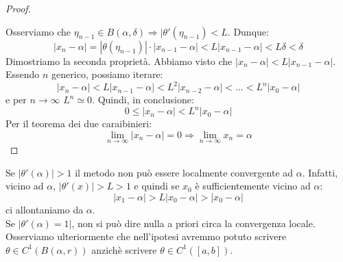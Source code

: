 \documentclass[12pt]{report}
\begin{document}
\begin{proof}
\begin{center}
	\end{center}
	Osserviamo che $\eta_{n-1} \in B(\alpha, \delta) \Rightarrow |\theta'(\eta_{n-1}) < L$. Dunque:
	\[
	|x_n - \alpha| = |\theta(\eta_{n-1})|\cdot |x_{n-1}-\alpha| < L|x_{n-1}-\alpha| < L\delta < \delta
	\]
	Dimostriamo la seconda proprietà. Abbiamo visto che $|x_n - \alpha| < L|x_{n-1} - \alpha|$. \\
	Essendo $n$ generico, possiamo iterare:
	\[
	|x_n - \alpha| < L|x_{n-1}-\alpha| < L^2|x_{n-2} - \alpha| < \dots < L^n|x_0 - \alpha|
	\]
	e per $n \to \infty$ $L^n \simeq 0$. Quindi, in conclusione:
	\[
	0 \leq |x_n - \alpha| < L^n|x_0 - \alpha|
	\]
	Per il teorema dei due caraibinieri:
	\[
	\lim\limits_{n\to\infty}|x_n - \alpha| = 0 \Rightarrow \lim\limits_{n\to\infty}x_n = \alpha
	\]
\end{proof}
\begin{note}{}{}
	Se $|\theta'(\alpha)| > 1$ il metodo non può essere localmente convergente ad $\alpha$. Infatti, vicino ad $\alpha$, $|\theta'(x)| > L > 1$ e quindi se $x_0$ è sufficientemente vicino ad $\alpha$:
	\[
	|x_1 - \alpha| > L|x_0 - \alpha| > |x_0 - \alpha|
	\]
	ci allontaniamo da $\alpha$. \\
	Se $|\theta'(\alpha) = 1|$, non si può dire nulla a priori circa la convergenza locale. \\
	Osserviamo ulteriormente che nell'ipotesi avremmo potuto scrivere $\theta \in C^1(B(\alpha, r))$ anzichè scrivere $\theta \in C^1([a, b])$.
\end{note}
\end{document}
